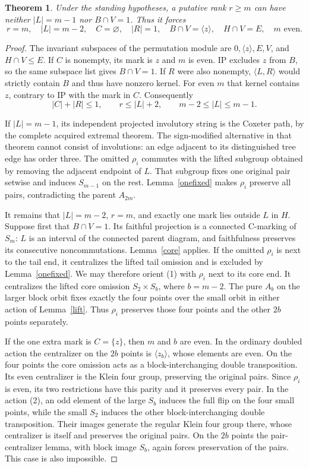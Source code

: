 \documentclass[11pt,a4paper]{article}
\newtheorem{theorem}[lemma]{Theorem}
\newcommand{\gen}[1]{\langle#1\rangle}
\begin{document}
\begin{theorem}\label{main}
Under the standing hypotheses, a putative rank $r\ge m$
can have neither $|L|=m-1$ nor $B\cap V=1$.
Thus it forces
\[
 r=m,\quad |L|=m-2,\quad C=\varnothing,\quad |R|=1,
 \quad B\cap V=\gen z,\quad H\cap V=E,
 \quad m\text{ even}.                                \tag{3}
\]
\end{theorem}
\begin{proof}
The invariant subspaces of the permutation module are
$0,\gen z,E,V$, and $H\cap V\le E$. If $C$ is nonempty,
its mark is $z$ and $m$ is even. IP excludes $z$ from $B$,
so the same subspace list gives $B\cap V=1$.
If $R$ were also nonempty, $\gen{L,R}$ would strictly
contain $B$ and thus have nonzero kernel. For even $m$
that kernel contains $z$, contrary to IP with the mark
in $C$. Consequently
\[
 |C|+|R|\le1,\qquad r\le |L|+2,\qquad
                         m-2\le |L|\le m-1.          \tag{4}
\]

If $|L|=m-1$, its independent projected involutory
string is the Coxeter path, by the complete acquired
extremal theorem. The sign-modified alternative in that
theorem cannot consist of involutions: an edge adjacent
to its distinguished tree edge has order three.
The omitted $\rho_i$ commutes with the lifted subgroup
obtained by removing the adjacent endpoint of $L$.
That subgroup fixes one original pair setwise and induces
$S_{m-1}$ on the rest. Lemma~\ref{onefixed} makes
$\rho_i$ preserve all pairs, contradicting the parent
$A_{2m}$.

It remains that $|L|=m-2$, $r=m$, and exactly one mark
lies outside $L$ in $H$. Suppose first that $B\cap V=1$.
Its faithful projection is a connected C-marking of $S_m$:
$L$ is an interval of the connected parent diagram, and
faithfulness preserves its consecutive noncommutations.
Lemma~\ref{core} applies.
If the omitted $\rho_i$ is next to the tail end, it
centralizes the lifted tail omission and is excluded by
Lemma~\ref{onefixed}. We may therefore orient (1) with
$\rho_i$ next to its core end. It centralizes the lifted
core omission $S_2\times S_b$, where $b=m-2$.
The pure $A_b$ on the larger block orbit fixes exactly
the four points over the small orbit in either action
of Lemma~\ref{lift}. Thus $\rho_i$ preserves those
four points and the other $2b$ points separately.

If the one extra mark is $C=\{z\}$, then $m$ and $b$
are even. In the ordinary doubled action the centralizer
on the $2b$ points is $\gen{z_b}$, whose elements are
even. On the four points the core omission acts as a
block-interchanging double transposition. Its even
centralizer is the Klein four group, preserving the
original pairs. Since $\rho_i$ is even, its two restrictions
have this parity and it preserves every pair.
In the action (2), an odd element of the large $S_b$
induces the full flip on the four small points, while
the small $S_2$ induces the other block-interchanging
double transposition. Their images generate the regular
Klein four group there, whose centralizer is itself and
preserves the original pairs. On the $2b$ points the
pair-centralizer lemma, with block image $S_b$, again
forces preservation of the pairs. This case is also
impossible.


\end{proof}
\end{document}
